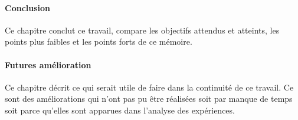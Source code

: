 \paragraph{Conclusion}
Ce chapitre conclut ce travail, compare les objectifs attendus et atteints, les points plus faibles et les points forts de ce mémoire. %

\paragraph{Futures amélioration}
Ce chapitre décrit ce qui serait utile de faire dans la continuité de ce travail. Ce sont des améliorations qui n'ont pas pu être réalisées soit par manque de temps soit parce qu'elles sont apparues dans l'analyse des expériences.
